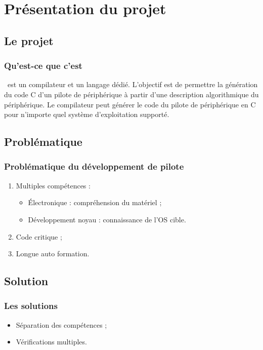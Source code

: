 \documentclass[]{beamer}
\title{\rtx}
\subtitle{Un DSL et son compilateur}
\author{David Pineau \\ \texttt{<david@lse.epitech.eu>}}
\begin{document}
\begin{frame}
\titlepage
\end{frame}



\section{Présentation du projet}

\subsection{Le projet}
\begin{frame}
\frametitle{Qu'est-ce que c'est}
\rtx\ est un compilateur et un langage dédié. L'objectif est de permettre la
génération du code C d'un pilote de périphérique à partir d'une description
algorithmique du périphérique. Le compilateur peut générer le code du pilote de
périphérique en C pour n'importe quel système d'exploitation supporté.
\end{frame}

\subsection{Problématique}
\begin{frame}
\frametitle{Problématique du développement de pilote}
\begin{enumerate}[<+->]
    \item Multiples compétences :
        \begin{itemize}[<1->]
            \item Électronique : compréhension du matériel ;
            \item Développement noyau : connaissance de l'OS cible.
        \end{itemize}
    \item Code critique ;
    \item Longue auto formation.
\end{enumerate}
\end{frame}

\subsection{Solution}
\begin{frame}
\frametitle{Les solutions}
\begin{itemize}[<+->]
    \item Séparation des compétences ;
    \item Vérifications multiples.
\end{itemize}
\end{frame}
\end{document}
